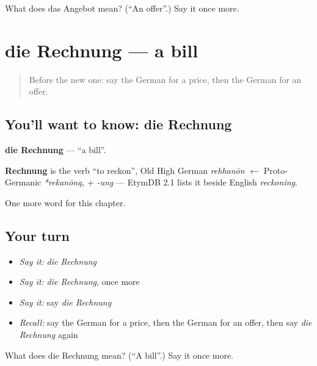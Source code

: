\begin{tcolorbox}[breakable,colback=teal!4,colframe=teal!35!black,title={Before you move on}]
What does das Angebot mean? (\textquotedblleft{}An offer\textquotedblright{}.) Say it once more.
\end{tcolorbox}
\section[die Rechnung]{die Rechnung — a bill}

\label{lesson:GE-C158-rechnung}



\begin{quote}
Before the new one: say the German for a price, then the German for an offer.
\end{quote}

\subsection*{You'll want to know: die Rechnung}
\textbf{die Rechnung} — \textquotedblleft{}a bill\textquotedblright{}.

\begin{cousinweb}
\textbf{Rechnung} is the verb \textquotedblleft{}to reckon\textquotedblright{}, Old High German \emph{rehhanōn} $\leftarrow$ Proto-Germanic \emph{*rekanōną}, + \emph{-ung} — EtymDB 2.1 lists it beside English \emph{reckoning}.
\end{cousinweb}

\begin{grammarlens}[title={What you've built}]
One more word for this chapter.
\end{grammarlens}

\subsection*{Your turn}
\begin{itemize}
\raggedright
  \item \emph{Say it:} \emph{die Rechnung}
  \item \emph{Say it:} \emph{die Rechnung}, once more
  \item \emph{Say it:} say \emph{die Rechnung}
  \item \emph{Recall:} say the German for a price, then the German for an offer, then say \emph{die Rechnung} again
\end{itemize}

\begin{tcolorbox}[breakable,colback=teal!4,colframe=teal!35!black,title={Before you move on}]
What does die Rechnung mean? (\textquotedblleft{}A bill\textquotedblright{}.) Say it once more.
\end{tcolorbox}
